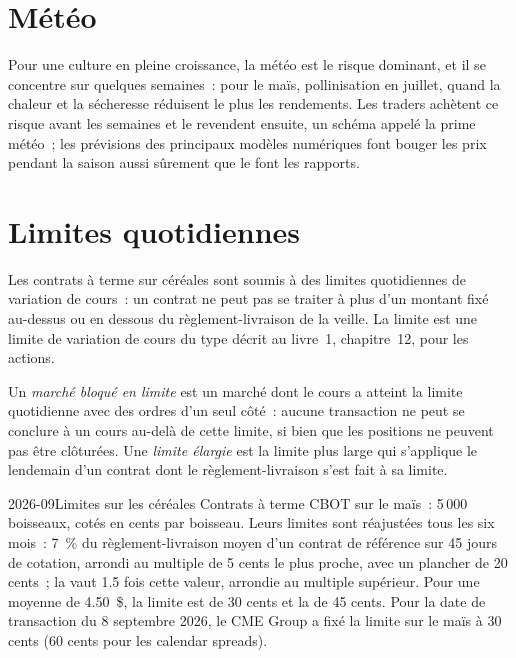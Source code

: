 \section{Météo}

Pour une culture en pleine croissance, la météo est le risque dominant, et il se concentre sur quelques semaines~: pour le maïs,
pollinisation en juillet, quand la chaleur et la sécheresse réduisent le plus les rendements. Les traders achètent ce risque avant les
semaines et le revendent ensuite, un schéma appelé la prime météo~; les prévisions des principaux
modèles numériques font bouger les prix pendant la saison aussi sûrement que le font les rapports.

\section{Limites quotidiennes}

Les contrats à terme sur céréales sont soumis à des limites quotidiennes de variation de cours~: un contrat ne peut pas se traiter à plus d'un montant fixé au-dessus ou
en dessous du règlement-livraison de la veille. La limite est une limite de variation de cours du type décrit au livre~1, chapitre~12,
pour les actions.

\begin{definition}\label{def:m3:agriculturals-and-softs:limit}
Un \emph{marché bloqué en limite} est un marché dont le cours a atteint la limite quotidienne
avec des ordres d'un seul côté~: aucune transaction ne peut se conclure à un cours au-delà de cette limite, si bien que les positions ne peuvent pas être clôturées.
Une \emph{limite élargie} est la limite plus large qui s'applique le lendemain
d'un contrat dont le règlement-livraison s'est fait à sa limite.
\end{definition}

\begin{dated}{2026-09}{Limites sur les céréales}\label{dat:m3:agriculturals-and-softs:limits}
Contrats à terme CBOT sur le maïs~: 5\,000 boisseaux, cotés en cents par boisseau. Leurs limites sont réajustées tous les six mois~:
7~\% du règlement-livraison moyen d'un contrat de référence sur 45 jours de cotation, arrondi
au multiple de 5 cents le plus proche, avec un plancher de 20 cents~; la  vaut 1.5 fois cette valeur, arrondie au multiple supérieur. Pour une moyenne de
4.50~\$, la limite est de 30 cents et la  de 45 cents. Pour la date de transaction du 8 septembre 2026, le CME
Group a fixé la limite sur le maïs à 30 cents (60 cents pour les calendar spreads).
\end{dated}

